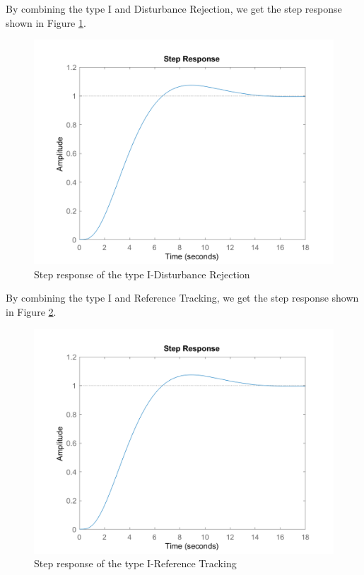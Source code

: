 \documentclass[a4paper, twocolumn, titlepage, 10pt]{article}
\begin{document}
		By combining the type I and Disturbance Rejection, we get the step response shown in Figure \ref{I-rej-step}.
		\begin{figure}[H]
			\centering
			\includegraphics[width=\linewidth]{I-rej-step}
			\caption{Step response of the type I-Disturbance Rejection}
			\label{I-rej-step} 
		\end{figure}
		By combining the type I and Reference Tracking, we get the step response shown in Figure \ref{I-track-step}.
		\begin{figure}[H]
			\centering
			\includegraphics[width=\linewidth]{I-track-step}
			\caption{Step response of the type I-Reference Tracking}
			\label{I-track-step} 
		\end{figure}
\end{document}

